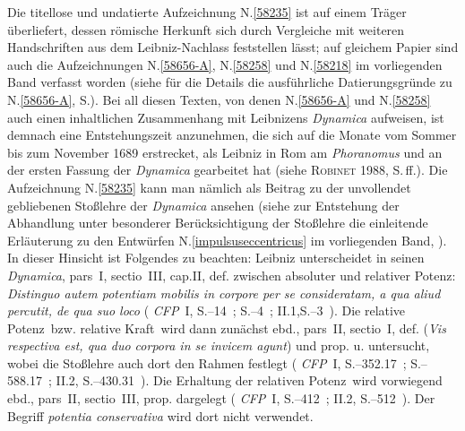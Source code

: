 \begin{ledgroup}
\footnotesize
\pstart
\noindent%
%
Die titellose und undatierte Aufzeichnung N.\;\ref{58235} ist auf einem Träger überliefert, dessen römische Herkunft sich durch Vergleiche mit weiteren Handschriften aus dem Leibniz-Nachlass feststellen lässt;
auf gleichem Papier sind auch die Aufzeichnungen N.\;\ref{58656-A}, N.\;\ref{58258} und N.\;\ref{58218} im vorliegenden Band verfasst worden (siehe für die Details die ausführliche Datierungsgründe zu N.\;\ref{58656-A}, S.\;\pageref{58656-A_dat}).
Bei all diesen Texten, von denen N.\;\ref{58656-A} und N.\;\ref{58258} auch einen inhaltlichen Zusammenhang mit Leibnizens \textit{Dynamica} aufweisen, %
ist demnach eine Entstehungszeit anzunehmen, die sich auf die Monate vom Sommer bis zum November 1689 erstrecket, als Leibniz in Rom am \textit{Phoranomus}\cite{01402} und an der ersten Fassung der \textit{Dynamica}\cite{01354} gearbeitet hat (siehe \textsc{Robinet} 1988, S.\,ff.).\cite{01240}
\pend%
\pstart%
Die Aufzeichnung N.\;\ref{58235} kann man nämlich als Beitrag zu der unvollendet gebliebenen Stoßlehre der \textit{Dynamica}\cite{01354} ansehen (siehe zur Entstehung der Abhandlung unter besonderer Berücksichtigung der Stoßlehre die einleitende Erläuterung zu den Entwürfen N.\;\ref{impulsuseccentricus} im vorliegenden Band, ).
In dieser Hinsicht ist Folgendes zu beachten:
Leibniz unterscheidet in seinen \textit{Dynamica}, pars~I, sectio~III, cap.\;II, def. zwischen absoluter und relativer Potenz: \textit{Distinguo autem potentiam mobilis  in corpore per se consideratam, a  qua aliud percutit, de qua suo loco} (%
\textit{CFP}~I, S.--14~; S.--4~; II.1,\;S.--3~).\cite{01354}
Die \glqq relative Potenz\grqq\ bzw. \glqq relative Kraft\grqq\ wird dann zunächst ebd., pars~II, sectio~I,  def. (\textit{Vis respectiva est, qua duo corpora in se invicem agunt}) und prop. u. untersucht, wobei die Stoßlehre auch dort den Rahmen festlegt (%
\textit{CFP}~I, S.--352.17~; S.--588.17~; II.2, S.--430.31~).\cite{01354}
Die Erhaltung der \glqq relativen Potenz\grqq\ wird vorwiegend ebd., pars~II, sectio~III, prop. dargelegt (%
\textit{CFP}~I, S.--412~; %
II.2, S.--512~).\cite{01354}
Der Begriff \textit{potentia conservativa} wird dort nicht verwendet.

\end{ledgroup}
